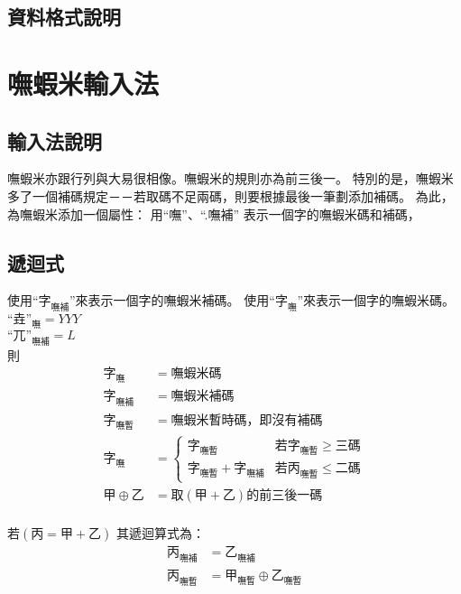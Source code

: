 \documentclass{article}
\begin{document}
\subsection{資料格式說明}

\section{嘸蝦米輸入法}
\subsection{輸入法說明}
嘸蝦米亦跟行列與大易很相像。嘸蝦米的規則亦為前三後一。
特別的是，嘸蝦米多了一個補碼規定－－若取碼不足兩碼，則要根據最後一筆劃添加補碼。
為此，為嘸蝦米添加一個屬性：
用``嘸''、``.嘸補'' 表示一個字的嘸蝦米碼和補碼，\\
\subsection{遞迴式}
使用``$\mbox{字}_{\mbox{嘸補}}$''來表示一個字的嘸蝦米補碼。
使用``$\mbox{字}_{\mbox{嘸}}$''來表示一個字的嘸蝦米碼。
$\mbox{``垚''}_{\mbox{嘸}}=YYY$\\
$\mbox{``兀''}_{\mbox{嘸補}}=L$\\
則
\begin{subequations}
  \begin{align}
  \mbox{字}_{\mbox{嘸}} &= 嘸蝦米碼\\
  \mbox{字}_{\mbox{嘸補}} &= 嘸蝦米補碼\\
  \mbox{字}_{\mbox{嘸暫}} &= 嘸蝦米暫時碼，即沒有補碼\\
  \mbox{字}_{\mbox{嘸}} &=
      \left\{\begin{array}{ll}
        \mbox{字}_{\mbox{嘸暫}}
           & \mbox{若$\mbox{字}_{\mbox{嘸暫}} \geq $三碼}\\
        \mbox{字}_{\mbox{嘸暫}}+\mbox{字}_{\mbox{嘸補}}
           & \mbox{若$\mbox{丙}_{\mbox{嘸暫}} \leq $二碼}
      \end{array}\right.\\
  甲 \oplus 乙 &= 取(甲+乙)的前三後一碼\\
  \end{align}
\end{subequations}

若$(\mbox{丙}=\mbox{甲}+\mbox{乙})$
其遞迴算式為：
\begin{subequations}
  \begin{align}
  \mbox{丙}_{\mbox{嘸補}}&=\mbox{乙}_{\mbox{嘸補}}\\
  \mbox{丙}_{\mbox{嘸暫}}&=\mbox{甲}_{\mbox{嘸暫}} \oplus \mbox{乙}_{\mbox{嘸暫}}\\
  \end{align}
\end{subequations}
\end{document}

